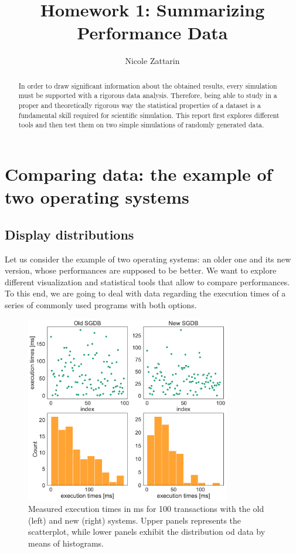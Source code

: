 \documentclass[twoside,onecolumn]{article}
\title{Homework 1: Summarizing Performance Data } %
\author{Nicole Zattarin}
\date{}
\theoremstyle{definition}
\begin{document}
\maketitle

\begin{abstract}
In order to draw significant information about the obtained results, every simulation must be supported with a rigorous data analysis. Therefore, being able to study in a proper and theoretically rigorous way the statistical properties of a dataset is a fundamental skill required for scientific simulation. This report first explores different tools and then test them on two simple simulations of randomly generated  data.
\end{abstract}



\section{Comparing data: the example of two operating systems}

\subsection{Display distributions}

Let us consider the example of two operating systems: an older one and its new version, whose performances are supposed to be better. We want to explore different visualization and statistical tools that allow to compare performances. To this end, we are going to deal with data regarding the execution times of a series of commonly used programs with both options.

\begin{figure}\centering
\includegraphics[width=0.8\textwidth]{../figs/extimes_distributions_vs_scatter.pdf}
\caption{Measured execution times in ms for 100 transactions with the old (left) and new (right) systems. Upper panels represents the scatterplot, while lower panels exhibit the distribution od data by means of histograms. }\label{fig:distribution_scatter}
\end{figure}
\end{document}
